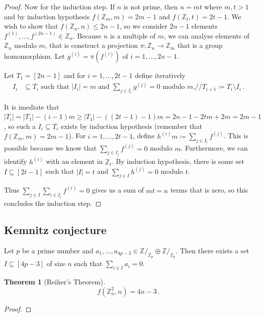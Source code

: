 \documentclass[12pt]{amsart}
\theoremstyle{definition}
\newtheorem{thm}{Theorem}[section]
\newcommand{\Z}{\mathbb{Z}}
\begin{document}
\begin{proof}
Now for the induction step.
If $n$ is not prime, then $n = mt$ where $m, t > 1$ and by induction hypothesis $f(\Z_m, m) = 2m - 1$ and $f(\Z_t, t) = 2t - 1$.
We wish to show that $f(\Z_n, n) \leq 2n-1$, so we consider $2n - 1$ elements $f^{(1)}, \ldots, f^{(2n  - 1 )} \in \Z_n$.
Because $n$ is a multiple of $m$, we can analyse elements of $\Z_n$ modulo $m$, that is construct a projection $\pi: \Z_n \to \Z_m$ that is a group homomorphism.
Let $g^{(i)} = \pi(f^{(i)})$ of $i = 1, \ldots, 2n - 1$.

Let $T_1 = [2n-1]$ and for $i = 1, \ldots, 2t-1$ define iteratively
\begin{align*}
I_i &\subseteq T_i \text{ such that $|I_i| = m$ and $\sum_{j\in I_i} g^{(j)} = 0$ modulo $m$,} //
T_{i+1} \coloneqq T_i \setminus I_i \, .
\end{align*}

It is imediate that $|T_i| = |T_1| - (i-1)m \geq  |T_1| - ((2t-1) - 1)m = 2n - 1 - 2tm  + 2m = 2m - 1$, so such a $I_i \subseteq T_i $ exists by induction hypothesis (remember that $f(\Z_m, m) = 2m-1$).
For $i=1, \ldots, 2t-1$, define $h^{(i)} m \coloneqq  \sum_{j \in I_i} f^{(j)}$.
This is possible because we know that $ \sum_{j \in I_j} f^{(j)} = 0 $ modulo $m$.
Furthermore, we can identify $h^{(i)} $ with an element in $\Z_t$.
By induction hypothesis, there is some set $I \subseteq [2t-1]$ such that $|I| = t$ and $\sum_{j\in I} h^{(j)} = 0 $ modulo $t$.

Thus $\sum_{j\in I} \sum_{i \in I_j} f^{(i)} = 0$ gives us a sum of $mt = n$ terms that is zero, so this concludes the induction step.
\end{proof}

\subsection{Kemnitz conjecture}

Let $p$ be a prime number and  $a_1, \ldots, a_{4p-3} \in \Z/_{\Z_p}\oplus \Z/_{\Z_p} $.
Then there exists a set $I\subseteq [4p-3] $ of size $n$ such that $\sum_{i\in I} a_i = 0$.


\begin{thm}[Reiher's Theorem]
$$f(\Z_n^2, n ) = 4n - 3 \, . $$
\end{thm}



\begin{proof}

\end{proof}
\end{document}
